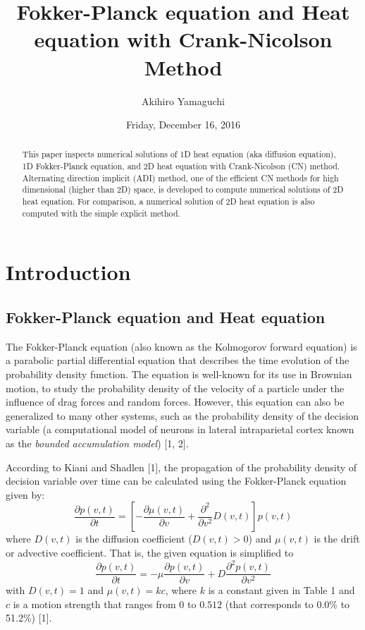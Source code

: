 \documentclass[12pt]{article}		%
\title{Fokker-Planck equation and Heat equation with Crank-Nicolson Method}
\author{Akihiro Yamaguchi}
\date{Friday, December 16, 2016}			%
\begin{document}
\maketitle
\begin{abstract}
This paper inspects numerical solutions of 1D heat equation (aka diffusion equation), 1D Fokker-Planck equation, and 2D heat equation with Crank-Nicolson (CN) method. Alternating direction implicit (ADI) method, one of the efficient CN methods for high dimensional (higher than 2D) space, is developed to compute numerical solutions of 2D heat equation. For comparison, a numerical solution of 2D heat equation is also computed with the simple explicit method.
\end{abstract}

\section*{Introduction}


\subsection*{Fokker-Planck equation and Heat equation}
The Fokker-Planck equation (also known as the Kolmogorov forward equation) is a parabolic partial differential equation that describes the time evolution of the probability density function. The equation is well-known for its use in Brownian motion, to study the probability density of the velocity of a particle under the influence of drag forces and random forces. However, this equation can also be generalized to many other systems, such as the probability density of the decision variable (a computational model of neurons in lateral intraparietal cortex known as the \textit{bounded accumulation model}) [1, 2].

According to Kiani and Shadlen [1], the propagation of the probability density of decision variable over time can be calculated using the Fokker-Planck equation given by:
\begin{equation} \label{eq:fp1d}
	\frac{\partial p(v,t)}{\partial t} = \left[- \frac{\partial \mu (v,t)}{\partial v} + \frac{\partial ^2}{\partial v^2} D(v,t) \right] p(v,t)
\end{equation}
where $D(v,t)$ is the diffusion coefficient ($D(v,t) > 0$) and $\mu (v,t)$ is the drift or advective coefficient. That is, the given equation is simplified to 
\[
	\frac{\partial p(v,t)}{\partial t} = -\mu \frac{\partial p(v,t)}{\partial v}   + D \frac{\partial ^2 p(v,t)}{\partial v^2}
\]
with $D(v,t) = 1$ and $\mu (v,t) = kc$, where $k$ is a constant given in Table 1 and $c$ is a motion strength that ranges from $0$ to $0.512$ (that corresponds to 0.0\% to 51.2\%) [1].
\end{document}
